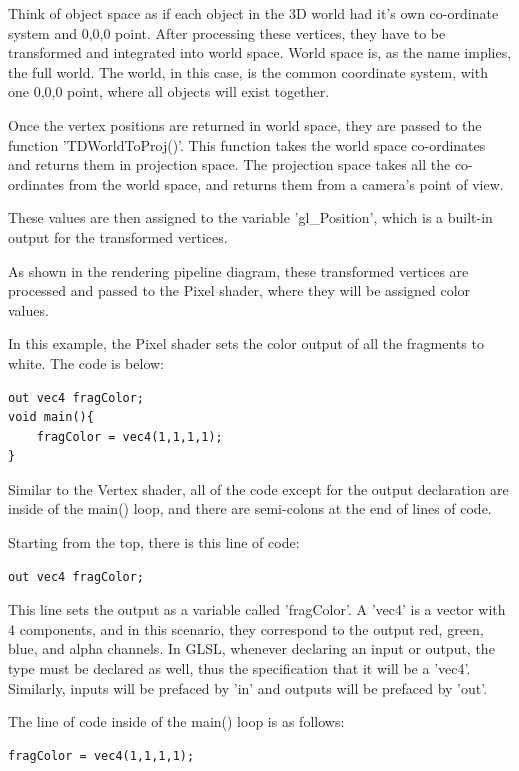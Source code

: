 \begin{fullwidth}
Think of object space as if each object in the 3D world had it's own co-ordinate system and 0,0,0 point. After processing these vertices, they have to be transformed and integrated into world space. World space is, as the name implies, the full world. The world, in this case, is the common coordinate system, with one 0,0,0 point, where all objects will exist together.

Once the vertex positions are returned in world space, they are passed to the function 'TDWorldToProj()'. This function takes the world space co-ordinates and returns them in projection space. The projection space takes all the co-ordinates from the world space, and returns them from a camera's point of view.

These values are then assigned to the variable 'gl\_Position', which is a built-in output for the transformed vertices.

As shown in the rendering pipeline diagram, these transformed vertices are processed and passed to the Pixel shader, where they will be assigned color values.

In this example, the Pixel shader sets the color output of all the fragments to white. The code is below:

\begin{lstlisting}
out vec4 fragColor;
void main(){
	fragColor = vec4(1,1,1,1);
}
\end{lstlisting}

Similar to the Vertex shader, all of the code except for the output declaration are inside of the main() loop, and there are semi-colons at the end of lines of code.

Starting from the top, there is this line of code:

\begin{lstlisting}
out vec4 fragColor;
\end{lstlisting}

This line sets the output as a variable called 'fragColor'. A 'vec4' is a vector with 4 components, and in this scenario, they correspond to the output red, green, blue, and alpha channels. In GLSL, whenever declaring an input or output, the type must be declared as well, thus the specification that it will be a 'vec4'. Similarly, inputs will be prefaced by 'in' and outputs will be prefaced by 'out'.

The line of code inside of the main() loop is as follows:

\begin{lstlisting}
fragColor = vec4(1,1,1,1);
\end{lstlisting}


\end{fullwidth}
